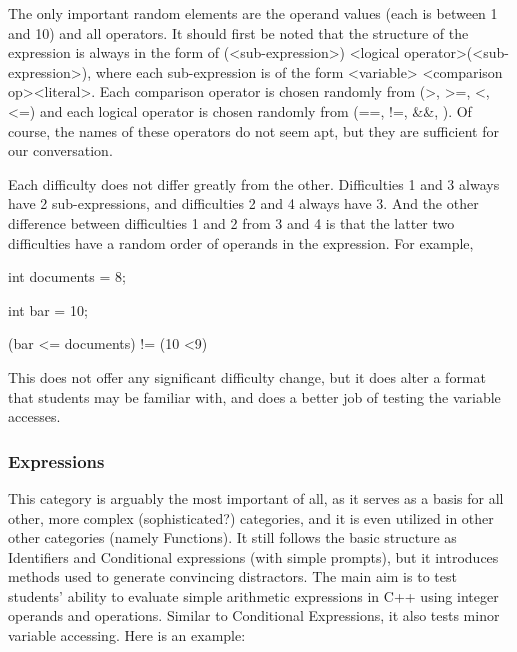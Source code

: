 \documentclass{article}
\begin{document}
\hfill \par

The only important random elements are the operand values (each is between 1 and 10) and all operators. It should first be noted that the structure of the expression
is always in the form of (\textless sub-expression\textgreater ) \textless logical operator\textgreater (\textless sub-expression\textgreater ), where each sub-expression is of the form \textless variable> \textless comparison op\textgreater \textless literal\textgreater .
Each comparison operator is chosen randomly from (\textgreater, \textgreater =, \textless , \textless =) and each logical operator is chosen randomly from (==, !=, \&\&, \textbar\textbar). Of course, the names
of these operators do not seem apt, but they are sufficient for our conversation.

Each difficulty does not differ greatly from the other. Difficulties 1 and 3 always have 2 sub-expressions, and difficulties 2 and 4 always have 3. And the other
difference between difficulties 1 and 2 from 3 and 4 is that the latter two difficulties have a random order of operands in the expression. For example,

\hfill \par
int documents = 8; \par
int bar = 10; \par
(bar \textless = documents) != (10 \textless 9) \par
\hfill \par

This does not offer any significant difficulty change, but it does alter a format that students may be familiar with, and does a better job of testing the variable accesses.


\subsubsection{Expressions}
This category is arguably the most important of all, as it serves as a basis for all other, more complex (sophisticated?) categories, and it is even utilized in other other categories
(namely Functions). It still follows the basic structure as Identifiers and Conditional expressions (with simple prompts), but it introduces methods used to generate convincing distractors.
The main aim is to test students' ability to evaluate simple arithmetic expressions in C++ using integer operands and operations. Similar to Conditional Expressions, it also
tests minor variable accessing. Here is an example:
\end{document}
